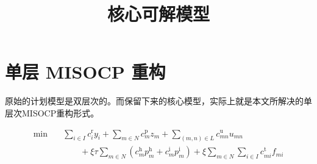 \documentclass[11pt,a4paper]{article}
\title{核心可解模型}
\author{}
\date{}
\begin{document}
\maketitle

\section*{单层 MISOCP 重构}
原始的计划模型是双层次的。而保留下来的核心模型，实际上就是本文所解决的单层次MISOCP重构形式。

\begin{equation}
\begin{aligned}
\min \quad
& \sum_{i \in I} c_i^{\mathrm r} y_i
+ \sum_{m \in N} c_m^{\mathrm p} z_m
+ \sum_{(m,n) \in L} c_{mn}^{\mathrm u} u_{mn} \\
& \qquad
+ \xi \tau \sum_{m \in N} \left(c_m^{\mathrm h} p_m^{\mathrm h} + c_m^{\mathrm i} p_m^{\mathrm i}\right)
+ \xi \sum_{m \in N} \sum_{i \in I} c_{mi}^{\mathrm t} f_{mi}
\end{aligned}
\tag{M1}
\end{equation}
\end{document}
